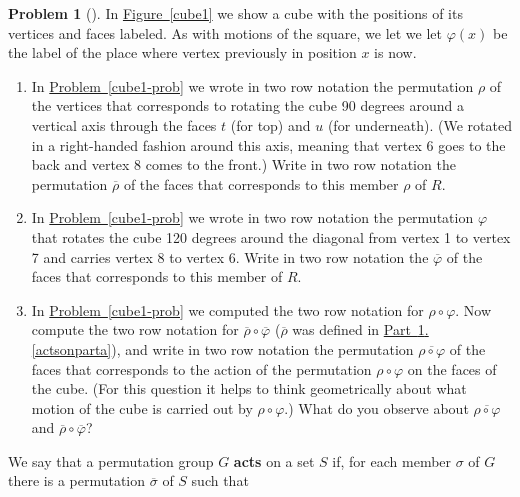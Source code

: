 \documentclass[10pt,]{book}
\newcommand{\terminology}[1]{\textbf{#1}}
\theoremstyle{plain}
\theoremstyle{definition}
\newtheorem{activity}[project]{Problem}
\theoremstyle{definition}
\numberwithin{equation}{chapter}
\begin{document}
\begin{activity}[] \label{activity-280}
\hypertarget{p-1590}{}%
In \hyperref[cube1]{Figure~\ref{cube1}} we show a cube with the positions of its vertices and faces labeled. As with motions of the square, we let we let \(\varphi(x)\) be the label of the place where vertex previously in position \(x\) is now.%
\begin{enumerate}[font=\bfseries,label=(\alph*),ref=\alph*]
\item\label{actsonparta} \marginsymbol[-2.5em]{} \hypertarget{p-1591}{}%
In \hyperref[cube1-prob]{Problem~\ref{cube1-prob}} we wrote in two row notation the permutation \(\rho\) of the vertices that corresponds to rotating the cube 90 degrees around a vertical axis through the faces \(t\) (for top) and \(u\) (for underneath). (We rotated in a right-handed fashion around this axis, meaning that vertex 6 goes to the back and vertex 8 comes to the front.) Write in two row notation the permutation \(\overline{\rho}\) of the faces that corresponds to this member \(\rho\) of \(R\). %
\item\label{task-206} \marginsymbol[-2.5em]{} \hypertarget{p-1593}{}%
In \hyperref[cube1-prob]{Problem~\ref{cube1-prob}} we wrote in two row notation the permutation \(\varphi\) that rotates the cube 120 degrees around the diagonal from vertex 1 to vertex 7 and carries vertex 8 to vertex 6.  Write in two row notation the \(\overline{\varphi}\) of the faces that corresponds to this member of \(R\).%
\item\label{cube2} \marginsymbol[-2.5em]{} \hypertarget{p-1595}{}%
In \hyperref[cube1-prob]{Problem~\ref{cube1-prob}} we computed the two row notation for \(\rho\circ\varphi\). Now compute the two row notation for \(\overline{\rho}\circ\overline{\varphi}\) (\(\overline{\rho}\) was defined in \hyperref[actsonparta]{Part~\ref{activity-280}.\ref{actsonparta}}), and write in two row notation the permutation \(\overline{\rho\circ\varphi}\) of the faces that corresponds to the action of the permutation \(\rho\circ\varphi\) on the faces of the cube. (For this question it helps to think geometrically about what motion of the cube is carried out by \(\rho\circ\varphi\).)  What do you observe about \(\overline{\rho\circ\varphi}\) and \(\overline{\rho}\circ\overline{\varphi}\)?%
\end{enumerate}
\end{activity}
\hypertarget{p-1597}{}%
We say that a permutation group \(G\) \terminology{acts} on a set \(S\) if, for each member \(\sigma\) of \(G\) there is a permutation \(\overline{\sigma}\) of \(S\) such that%
\end{document}
